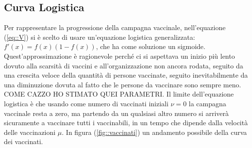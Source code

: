 \documentclass{article}
\begin{document}
 \subsection{Curva Logistica}
Per rappresentare la progressione della campagna vaccinale, 
nell'equazione (\ref{eq::V}) si è scelto di usare un'equazione 
logistica generalizzata: $f'(x)=f(x)(1-f(x))$,
che ha come soluzione un sigmoide. Quest'approssimazione è 
ragionevole perché ci si aspettava un inizio più lento dovuto alla 
scarsità di vaccini e all'organizzazione non ancora rodata, 
seguito da una crescita veloce della quantità di persone vaccinate, 
seguito inevitabilmente da una diminuzione dovuta al fatto che le 
persone da vaccinare sono sempre meno. 
COME CAZZO HO STIMATO QUEI PARAMETRI.
Il limite dell'equazione logistica è che usando come numero di 
vaccinati iniziali $\nu = 0$ la campagna vaccinale resta a zero, 
ma partendo da un qualsiasi altro numero si arriverà sicuramente a 
vaccinare tutti i vaccinabili, in un tempo che dipende dalla velocità 
delle vaccinazioni $\mu$. In figura (\ref{fig::vaccinati}) un 
andamento possibile della curva dei vaccinati.\\
\end{document}
